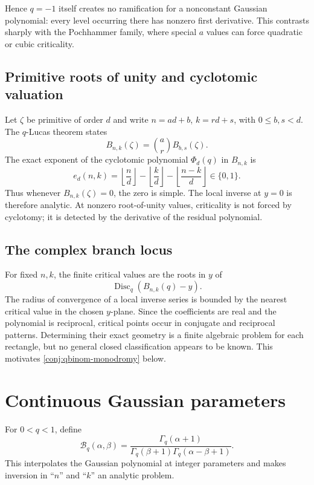 \documentclass[11pt,oneside]{book}
\theoremstyle{definition}
\theoremstyle{remark}
\newcommand{\Disc}{\operatorname{Disc}}
\begin{document}
Hence $q=-1$ itself creates no ramification for a nonconstant Gaussian
polynomial: every level occurring there has nonzero first derivative.  This
contrasts sharply with the Pochhammer family, where special $a$ values can
force quadratic or cubic criticality.

\section{Primitive roots of unity and cyclotomic valuation}
Let $\zeta$ be primitive of order $d$ and write
$n=ad+b$, $k=rd+s$, with $0\le b,s<d$.  The $q$-Lucas theorem states
\begin{equation}\label{eq:q-lucas}
 B_{n,k}(\zeta)=\binom ar B_{b,s}(\zeta).
\end{equation}
The exact exponent of the cyclotomic polynomial $\Phi_d(q)$ in $B_{n,k}$ is
\begin{equation}\label{eq:cyclotomic-exponent}
 e_d(n,k)=\left\lfloor\frac nd\right\rfloor
 -\left\lfloor\frac kd\right\rfloor
 -\left\lfloor\frac{n-k}{d}\right\rfloor\in\{0,1\}.
\end{equation}
Thus whenever $B_{n,k}(\zeta)=0$, the zero is simple.  The local inverse at
$y=0$ is therefore analytic.  At nonzero root-of-unity values, criticality is
not forced by cyclotomy; it is detected by the derivative of the residual
polynomial.

\section{The complex branch locus}
For fixed $n,k$, the finite critical values are the roots in $y$ of
\[
 \Disc_q(B_{n,k}(q)-y).
\]
The radius of convergence of a local inverse series is bounded by the nearest
critical value in the chosen $y$-plane.  Since the coefficients are real and
the polynomial is reciprocal, critical points occur in conjugate and
reciprocal patterns.  Determining their exact geometry is a finite algebraic
problem for each rectangle, but no general closed classification appears to
be known.  This motivates \cref{conj:qbinom-monodromy} below.

\chapter{Continuous Gaussian parameters}

For $0<q<1$, define
\begin{equation}\label{eq:continuous-qbinom}
 \mathcal B_q(\alpha,\beta)
 =\frac{\Gamma_q(\alpha+1)}
 {\Gamma_q(\beta+1)\Gamma_q(\alpha-\beta+1)}.
\end{equation}
This interpolates the Gaussian polynomial at integer parameters and makes
inversion in ``$n$'' and ``$k$'' an analytic problem.
\end{document}
